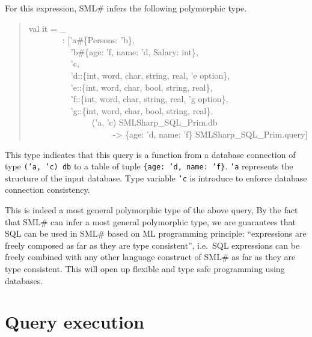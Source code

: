 \documentclass{jbook}
\newcommand{\txt}[2]{#2}
\newcommand{\smlsharp}{SML\#}
\newenvironment{program}{\begin{tt}\begin{quote}}{\end{quote}\end{tt}}
\newcommand{\myem}{\ \ \ \ \  }
\begin{document}
	For this expression, \smlsharp{} infers the following
polymorphic type.
\begin{program}
val it = \_
\\\myem\ \ \   : ['a\#\{Persons: 'b\},
\\\myem\myem     'b\#\{age: 'f, name: 'd, Salary: int\},
\\\myem\myem     'c,
\\\myem\myem     'd::\{int, word, char, string, real, 'e option\},
\\\myem\myem     'e::\{int, word, char, bool, string, real\},
\\\myem\myem     'f::\{int, word, char, string, real, 'g option\},
\\\myem\myem     'g::\{int, word, char, bool, string, real\}.
\\\myem\myem\myem       ('a, 'c) SMLSharp\_SQL\_Prim.db
\\\myem\myem\myem\myem  -> \{age: 'd, name: 'f\} SMLSharp\_SQL\_Prim.query]
\end{program}
	This type indicates that this query is a function from a database
connection of type {\tt  ('a, 'c) db} to a table of tuple {\tt \{age: 'd,
name: 'f\}}.
	{\tt 'a} represents the structure of the input database.
	Type variable {\tt 'c} is introduce to enforce database
connection consistency.
	
	This is indeed a most general polymorphic type of the above
query,
	By the fact that \smlsharp{} can infer a most general
polymorphic type, we are guarantees that SQL can be used in \smlsharp{}
based on ML programming principle: ``expressions are freely
composed as far as they are type consistent'', i.e.\ 
SQL expressions can be freely combined with any other language construct
of \smlsharp{} as far as they are type consistent.
	This will open up flexible and type safe programming using
databases.

\fi%

\section{\txt{問い合わせの実行}{Query execution}}
\label{sec:tutorialExecutingSQL}
\end{document}
